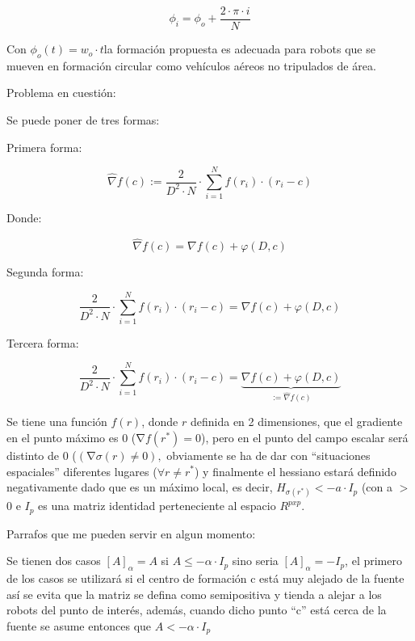 \noindent 
\[{\phi }_i={\phi }_{o}+\frac{2\cdot\pi \cdot{i}}{N} \] 

Con ${\phi }_{o}\left(t\right)=w_{o}\cdot{t}$la formación propuesta es adecuada para robots que se mueven en formación circular como vehículos aéreos no tripulados de área.

Problema en cuestión:

Se puede poner de tres formas:

Primera forma:

\begin{equation*}
	\hat{\nabla}{f}\left(c\right):=\frac{2}{{D}^2\cdot{N}}\cdot\sum_{i=1}^{N}f(r_{i})\cdot(r_{i}-c)
\end{equation*}

Donde:

\begin{equation*}
	\hat{\nabla}{f}\left(c\right) = \nabla{f}\left(c\right) + \varphi\left(D,c\right)
\end{equation*}

Segunda forma:

\begin{equation*}
	\frac{2}{{D}^2\cdot{N}}\cdot\sum_{i=1}^{N}f(r_{i})\cdot(r_{i}-c)=\nabla{f}\left(c\right) + \varphi\left(D,c\right)
\end{equation*}


Tercera forma:

\begin{equation*}
	\frac{2}{{D}^2\cdot{N}}\cdot\sum_{i=1}^{N}f(r_{i})\cdot(r_{i}-c)=\underbrace{\nabla{f}\left(c\right) + \varphi\left(D,c\right)}_{:=\hat{\nabla}{f}\left(c\right)}
\end{equation*}


Se tiene una función $f\left(r\right)$, donde $r$ definida en 2 dimensiones, que el gradiente en el punto máximo es 0 ($\mathrm{\nabla }f\left(r^*\right)=0$), pero en el punto del campo escalar será distinto de 0 ($\left(\mathrm{\nabla }\sigma \left(r\right)\neq 0\right),$ obviamente se ha de dar con ``situaciones espaciales'' diferentes lugares ($\forall r\neq r^*$) y finalmente el hessiano estará definido negativamente dado que es un máximo local, es decir, $H_{\sigma (r^*)}<-a\cdot{I}_{p}$ (con a $\mathrm{>}$ 0 e $I_p$ es una matriz identidad perteneciente al espacio $R^{pxp}$.



Parrafos que me pueden servir en algun momento:


Se tienen dos casos ${\left[A\right]}_{\alpha }=A$ si $A\le -\alpha \cdot{I}_{p}$  sino seria  ${\left[A\right]}_{\alpha }=-I_p$, el primero de los casos se utilizará si el centro de formación c está muy alejado de la fuente así se evita que la matriz se defina como semipositiva y tienda a alejar a los robots del punto de interés, además, cuando dicho punto ``c'' está cerca de la fuente se asume entonces que $A<-\alpha \cdot{I}_{p}$
